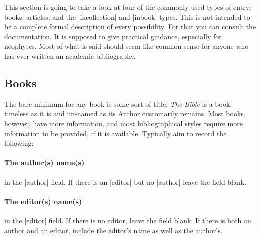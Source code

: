This section is going to take a look at four of the commonly used
types of entry: books, articles, and the |incollection| and
|inbook| types. This is not intended to be a complete formal
description of every possibility. For that you can consult the
documentation. It is supposed to give
practical guidance, especially for neophytes. Most of what is said
should seem like common sense for anyone who has ever written an
academic bibliography.

\subsection{Books}

The bare minimum for any book is some sort of title. \emph{The Bible}
is a book, timeless as it is and un-named as its Author customarily
remains. Most books, however, have more information, and most
bibliographical styles require more information to be provided, if it
is available. Typically aim to record the following:

\paragraph{The author(s) name(s)} in the |author| field. If there is
an |editor| but no |author| leave the field blank.

\paragraph{The editor(s) name(s)} in the |editor| field. If there is
no editor, leave the field blank. If there is both an author and an
editor, include the editor's name as well as the author's.

